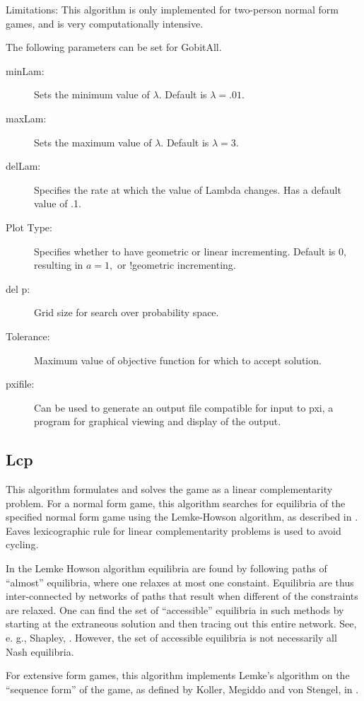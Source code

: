 Limitations:  This algorithm is only implemented for two-person normal
form games, and is very computationally intensive.

The following parameters can be set for GobitAll.

\begin{description}
\item[minLam:] Sets the minimum value of $\lambda.$
Default is $\lambda = .01.$
\item[maxLam:]  Sets the maximum value of $\lambda.$
Default is $\lambda = 3.$ 
\item[delLam:] Specifies the rate at which the value of Lambda changes.
Has a default value of .1.
\item[Plot Type:] Specifies whether to have geometric or linear incrementing.
Default is 0, resulting in $a = 1,$ or !geometric incrementing.
\item[del p:] Grid size for search over probability space.  
\item[Tolerance:] Maximum value of objective function for which to accept solution.  
\item[pxifile:] Can be used to generate an output file compatible for
input to pxi, a program for graphical viewing and display of the output.
\end{description}

\subsection{Lcp}\label{Lcp}
This algorithm formulates and solves the game as a linear complementarity problem.  
For a normal form game, this algorithm searches for equilibria of the
specified normal form game using the Lemke-Howson algorithm, as described
in \cite{LemHow:64}. Eaves \cite{Eav:71} lexicographic rule for
linear complementarity problems is used to avoid cycling.

In the Lemke Howson algorithm equilibria are found by following paths of
``almost'' equilibria, where one relaxes at most one constaint.
Equilibria are thus inter-connected by networks of paths that result when
different of the constraints are relaxed.  One can find the set of
``accessible''  equilibria in such methods by starting at the extraneous
solution and then tracing out this entire network.  See, e. g., Shapley,
\cite{Sha:74}.  However, the set of accessible equilibria is not necessarily all
Nash equilibria.

For extensive form games, this algorithm implements Lemke's algorithm
on the ``sequence form'' of the game, as defined by Koller, Megiddo 
and von Stengel, in \cite{KolMegSte:94}.

